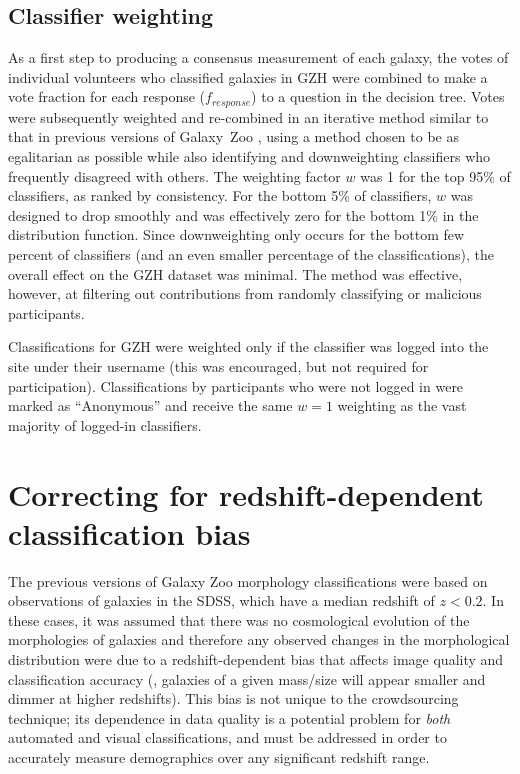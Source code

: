 \documentclass[a4paper,fleqn,usenatbib]{mnras}
\begin{document}
\subsection{Classifier weighting}\label{ssec:weighting}

As a first step to producing a consensus measurement of each galaxy, the votes
of individual volunteers who classified galaxies in GZH were combined to make a
vote fraction for each response ($f_{response}$) to a question in the decision
tree. Votes were subsequently weighted and re-combined in an iterative method
similar to that in previous versions of Galaxy~Zoo \citep{lan08,wil13}, using a
method chosen to be as egalitarian as possible while also identifying and
downweighting classifiers who frequently disagreed with others. The weighting
factor $w$ was 1 for the top 95\% of classifiers, as ranked by consistency.
For the bottom 5\% of classifiers, $w$ was designed to drop smoothly and was
effectively zero for the bottom 1\% in the distribution function. Since
downweighting only occurs for the bottom few percent of classifiers (and an even smaller
percentage of the classifications), the overall effect on the GZH dataset was
minimal. The method was effective, however, at filtering out contributions from
randomly classifying or malicious participants.

Classifications for GZH were weighted only if the classifier was logged
into the site under their username (this was encouraged, but not required for
participation). Classifications by participants who were not logged in were marked as
``Anonymous'' and receive the same $w=1$ weighting as the vast majority
of logged-in classifiers.


\section{Correcting for redshift-dependent classification bias}\label{sec:debiasing}

The previous versions of Galaxy Zoo morphology classifications
\citep{lin11,wil13} were based on observations of galaxies in the SDSS,
which have a median redshift of $z<0.2$. In these cases, it
was assumed that there was no cosmological evolution of the morphologies of
galaxies and therefore any observed changes in the morphological distribution
were due to a redshift-dependent bias that affects image quality and
classification accuracy (\ie, galaxies of a given mass/size will appear smaller
and dimmer at higher redshifts).  This bias is not unique to the crowdsourcing
technique; its dependence in data quality is a potential problem for
\emph{both} automated and visual classifications, and must be addressed in
order to accurately measure demographics over any significant redshift range. 
\end{document}
